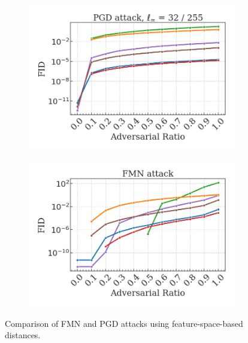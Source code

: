 \begin{figure}[H]
    \begin{subfigure}[b]{0.45\textwidth}
        \centering
        \includegraphics[width=\textwidth]{img/results_discussion/adversarial/PGD_FID.png}
    \end{subfigure}
    \hfill
    \begin{subfigure}[b]{0.45\textwidth}
        \centering
        \includegraphics[width=\textwidth]{img/results_discussion/adversarial/FMN_FID.png}
    \end{subfigure}

    \caption{Comparison of FMN and PGD attacks using feature-space-based distances.}
    \label{fig:comparison_feat_metrics}
\end{figure}


 \cleardoublepage

